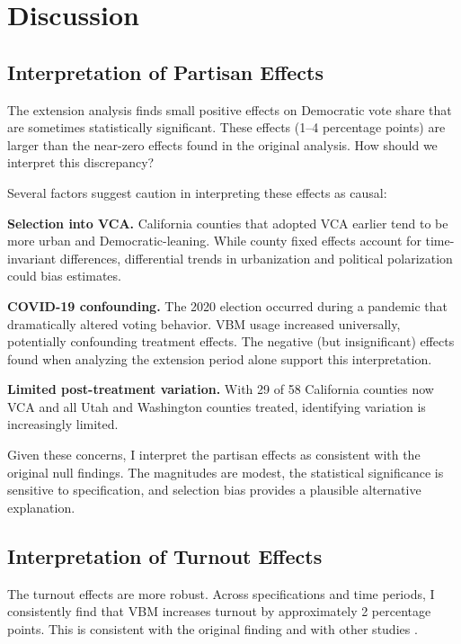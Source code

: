 \documentclass[12pt]{article}
\begin{document}
\section{Discussion}

\subsection{Interpretation of Partisan Effects}

The extension analysis finds small positive effects on Democratic vote share that are sometimes statistically significant. These effects (1--4 percentage points) are larger than the near-zero effects found in the original \citet{thompson2020universal} analysis. How should we interpret this discrepancy?

Several factors suggest caution in interpreting these effects as causal:

\textbf{Selection into VCA.} California counties that adopted VCA earlier tend to be more urban and Democratic-leaning. While county fixed effects account for time-invariant differences, differential trends in urbanization and political polarization could bias estimates.

\textbf{COVID-19 confounding.} The 2020 election occurred during a pandemic that dramatically altered voting behavior. VBM usage increased universally, potentially confounding treatment effects. The negative (but insignificant) effects found when analyzing the extension period alone support this interpretation.

\textbf{Limited post-treatment variation.} With 29 of 58 California counties now VCA and all Utah and Washington counties treated, identifying variation is increasingly limited.

Given these concerns, I interpret the partisan effects as consistent with the original null findings. The magnitudes are modest, the statistical significance is sensitive to specification, and selection bias provides a plausible alternative explanation.

\subsection{Interpretation of Turnout Effects}

The turnout effects are more robust. Across specifications and time periods, I consistently find that VBM increases turnout by approximately 2 percentage points. This is consistent with the original \citet{thompson2020universal} finding and with other studies \citep{gerber2013field}.
\end{document}
